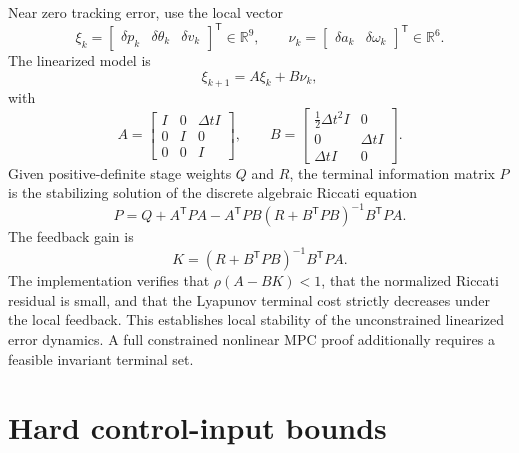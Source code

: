 \documentclass[11pt]{article}
\newcommand{\R}{\mathbb{R}}
\newcommand{\transpose}{\mathsf{T}}
\begin{document}
Near zero tracking error, use the local vector
\begin{equation}
\xi_k=\begin{bmatrix}\delta p_k&\delta\theta_k&\delta v_k\end{bmatrix}^\transpose
\in\R^9,
\qquad
\nu_k=\begin{bmatrix}\delta a_k&\delta\omega_k\end{bmatrix}^\transpose\in\R^6.
\end{equation}
The linearized model is
\begin{equation}
\xi_{k+1}=A\xi_k+B\nu_k,
\end{equation}
with
\begin{equation}
A=\begin{bmatrix}
I&0&\Delta t I\\
0&I&0\\
0&0&I
\end{bmatrix},
\qquad
B=\begin{bmatrix}
\tfrac{1}{2}\Delta t^2I&0\\
0&\Delta t I\\
\Delta t I&0
\end{bmatrix}.
\end{equation}
Given positive-definite stage weights $Q$ and $R$, the terminal information matrix $P$ is the
stabilizing solution of the discrete algebraic Riccati equation
\begin{equation}
P=Q+A^\transpose PA
-A^\transpose PB(R+B^\transpose PB)^{-1}B^\transpose PA.
\label{eq:dare}
\end{equation}
The feedback gain is
\begin{equation}
K=(R+B^\transpose PB)^{-1}B^\transpose PA.
\end{equation}
The implementation verifies that $\rho(A-BK)<1$, that the normalized Riccati residual is small,
and that the Lyapunov terminal cost strictly decreases under the local feedback.  This establishes
local stability of the unconstrained linearized error dynamics.  A full constrained nonlinear MPC
proof additionally requires a feasible invariant terminal set.

\section{Hard control-input bounds}
\end{document}
